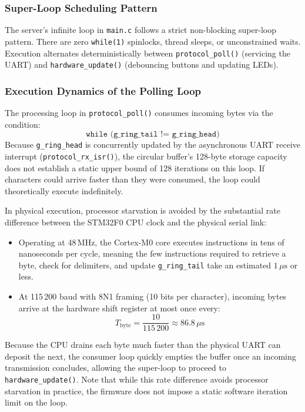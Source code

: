 \subsubsection{Super-Loop Scheduling Pattern}
The server's infinite loop in \texttt{main.c} follows a strict non-blocking super-loop pattern.
There are zero \texttt{while(1)} spinlocks, thread sleeps, or unconstrained waits.
Execution alternates deterministically between \texttt{protocol\_poll()} (servicing the UART) and \texttt{hardware\_update()} (debouncing buttons and updating LEDs).

\subsubsection{Execution Dynamics of the Polling Loop}
The processing loop in \texttt{protocol\_poll()} consumes incoming bytes via the condition:
\begin{equation}
\texttt{while (g\_ring\_tail != g\_ring\_head)}
\end{equation}
Because \texttt{g\_ring\_head} is concurrently updated by the asynchronous UART receive interrupt (\texttt{protocol\_rx\_isr()}), the circular buffer's 128-byte storage capacity does not establish a static upper bound of 128 iterations on this loop.
If characters could arrive faster than they were consumed, the loop could theoretically execute indefinitely.

In physical execution, processor starvation is avoided by the substantial rate difference between the STM32F0 CPU clock and the physical serial link:
\begin{itemize}
    \item Operating at 48\,MHz, the Cortex-M0 core executes instructions in tens of nanoseconds per cycle, meaning the few instructions required to retrieve a byte, check for delimiters, and update \texttt{g\_ring\_tail} take an estimated $1\,\mu\text{s}$ or less.
    \item At 115\,200 baud with 8N1 framing (10 bits per character), incoming bytes arrive at the hardware shift register at most once every:
    \begin{equation}
    T_{\text{byte}} = \frac{10}{115\,200} \approx 86.8\,\mu\text{s}
    \end{equation}
\end{itemize}
Because the CPU drains each byte much faster than the physical UART can deposit the next, the consumer loop quickly empties the buffer once an incoming transmission concludes, allowing the super-loop to proceed to \texttt{hardware\_update()}.
Note that while this rate difference avoids processor starvation in practice, the firmware does not impose a static software iteration limit on the loop.

